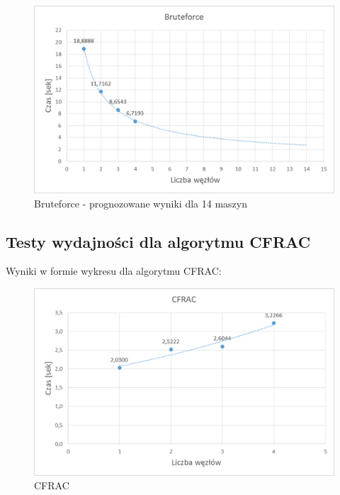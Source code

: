 \documentclass{article}
\begin{document}
\begin{figure}[h!]
    \includegraphics[width=\linewidth]{Bruteforce_prognoza.png}
    \caption{Bruteforce - prognozowane wyniki dla 14 maszyn}
    \label{fig:userpagescr}
\end{figure}

\newpage
\subsection{Testy wydajności dla algorytmu CFRAC}
Wyniki w formie wykresu dla algorytmu CFRAC:
\begin{figure}[h!]
    \includegraphics[width=\linewidth]{CFRAC.png}
    \caption{CFRAC}
    \label{fig:userpagescr}
\end{figure}
\end{document}
